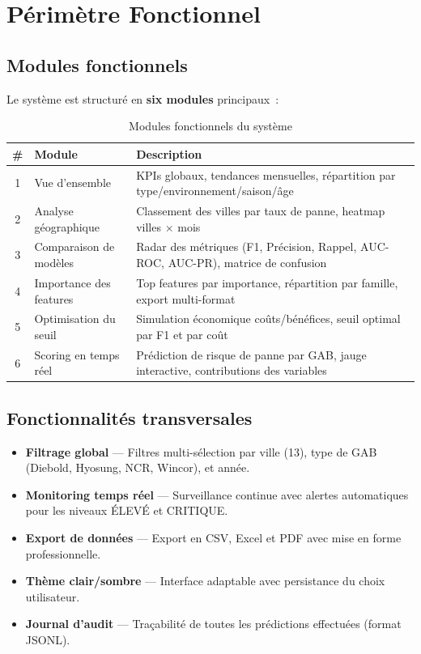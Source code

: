 \documentclass[a4paper,12pt]{report}
\begin{document}
\chapter{Périmètre Fonctionnel}

\section{Modules fonctionnels}

Le système est structuré en \textbf{six modules} principaux~:

\begin{table}[h!]
\centering
\renewcommand{\arraystretch}{1.4}
\begin{tabularx}{\textwidth}{|c|l|X|}
\hline
\rowcolor{bpmblue!10}
\textbf{\#} & \textbf{Module} & \textbf{Description} \\
\hline
1 & Vue d'ensemble & KPIs globaux, tendances mensuelles, répartition par type/environnement/saison/âge \\
\hline
2 & Analyse géographique & Classement des villes par taux de panne, heatmap villes $\times$ mois \\
\hline
3 & Comparaison de modèles & Radar des métriques (F1, Précision, Rappel, AUC-ROC, AUC-PR), matrice de confusion \\
\hline
4 & Importance des features & Top features par importance, répartition par famille, export multi-format \\
\hline
5 & Optimisation du seuil & Simulation économique coûts/bénéfices, seuil optimal par F1 et par coût \\
\hline
6 & Scoring en temps réel & Prédiction de risque de panne par GAB, jauge interactive, contributions des variables \\
\hline
\end{tabularx}
\caption{Modules fonctionnels du système}
\end{table}

\section{Fonctionnalités transversales}

\begin{itemize}
    \item \textbf{Filtrage global} — Filtres multi-sélection par ville (13), type de GAB (Diebold, Hyosung, NCR, Wincor), et année.
    \item \textbf{Monitoring temps réel} — Surveillance continue avec alertes automatiques pour les niveaux ÉLEVÉ et CRITIQUE.
    \item \textbf{Export de données} — Export en CSV, Excel et PDF avec mise en forme professionnelle.
    \item \textbf{Thème clair/sombre} — Interface adaptable avec persistance du choix utilisateur.
    \item \textbf{Journal d'audit} — Traçabilité de toutes les prédictions effectuées (format JSONL).
\end{itemize}
\end{document}
